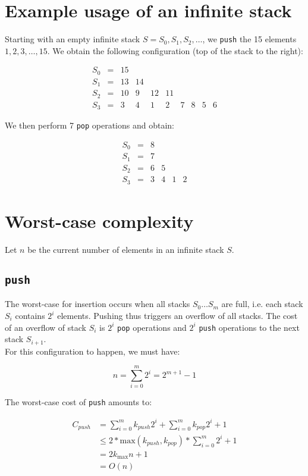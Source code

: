 \section{Example usage of an infinite stack}
Starting with an empty infinite stack $S = S_0, S_1, S_2, \ldots$, we \texttt{push} the 15 elements $1, 2, 3,\ldots, 15$. We obtain the following configuration (top of the stack to the right):

\[
\begin{array}{lcccccccccc}
  S_0 & = & 15\\
  S_1 & = & 13 & 14\\
  S_2 & = & 10 & 9 & 12 & 11\\
  S_3 & = & 3 & 4 & 1 & 2 & 7 & 8 & 5 & 6
\end{array}
\]

We then perform 7 \texttt{pop} operations and obtain:

\[
\begin{array}{lcccccccccc}
  S_0 & = & 8\\
  S_1 & = & 7\\
  S_2 & = & 6 & 5 &\\
  S_3 & = & 3 & 4 & 1 & 2
\end{array}
\]

\section{Worst-case complexity}
Let $n$ be the current number of elements in an infinite stack $S$.

  \subsection{\texttt{push}}
  \label{worst-case-push}
  The worst-case for insertion occurs when all stacks $S_0\ldots S_m$ are full, i.e. each stack $S_i$ contains $2^i$ elements. Pushing thus triggers an overflow of all stacks. The cost of an overflow of stack $S_i$ is $2^i$ \texttt{pop} operations and $2^i$ \texttt{push} operations to the next stack $S_{i+1}$.\\
  For this configuration to happen, we must have:

  \[
    n = \sum_{i=0}^m 2^i = 2^{m+1} - 1
  \]

  The worst-case cost of \texttt{push} amounts to:

  \[
  \begin{array}{ll}
    C_{push} & = \sum_{i=0}^m k_{push} 2^i + \sum_{i=0}^m k_{pop} 2^i + 1\\
             & \leq 2 * \text{max}(k_{push}, k_{pop}) * \sum_{i=0}^m 2^i + 1\\
             & = 2 k_{\text{max}} n + 1\\
             & = O(n)
  \end{array}
  \]

